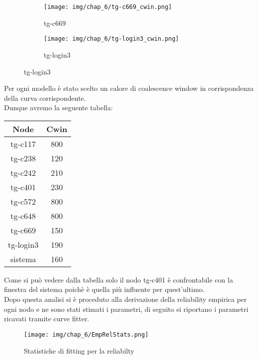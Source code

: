 \begin{figure}[H]
    \centering
     \begin{subfigure}{0.25\textwidth}
        \centering
        \texttt{[image: img/chap\_6/tg-c669\_cwin.png]}
        \caption{tg-c669}
        \label{fig:tgc669}
    \end{subfigure}
    \begin{subfigure}{0.25\textwidth}
        \centering
        \texttt{[image: img/chap\_6/tg-login3\_cwin.png]}
        \caption{tg-login3}
        \label{fig:tglogin3}
    \end{subfigure}
\end{figure}
\noindent
Per ogni modello è stato scelto un calore di coalescence window in corrispondenza della curva corrispondente.\\
Dunque avremo la seguente tabella:
 \begin{table}[htbp]
    \centering
    \label{tab:esempio}
    \begin{tabular}{|c|c|} %
        \hline
        Node & Cwin  \\ %
        \hline
        tg-c117 & 800 \\
        tg-c238 & 120 \\
        tg-c242 & 210 \\
        tg-c401 & 230 \\
        tg-c572 & 800 \\
        tg-c648 & 800 \\
        tg-c669 & 150 \\
        tg-login3 & 190\\
        sistema & 160\\
        \hline
    \end{tabular}
\end{table}
\noindent
Come si può vedere dalla tabella solo il nodo tg-c401 è confrontabile con la finestra del sistema poichè è quella più influente per quest'ultimo.\\
Dopo questa analisi si è proceduto alla derivazione della reliability empirica per ogni nodo e ne sono stati stimati i parametri, di seguito si riportano i parametri ricavati tramite curve fitter.\\
\begin{figure}[H]
    \centering
    \texttt{[image: img/chap\_6/EmpRelStats.png]}
    \caption{Statistiche di fitting per la reliabilty}
    \label{fig:StatsempRel}
\end{figure}
